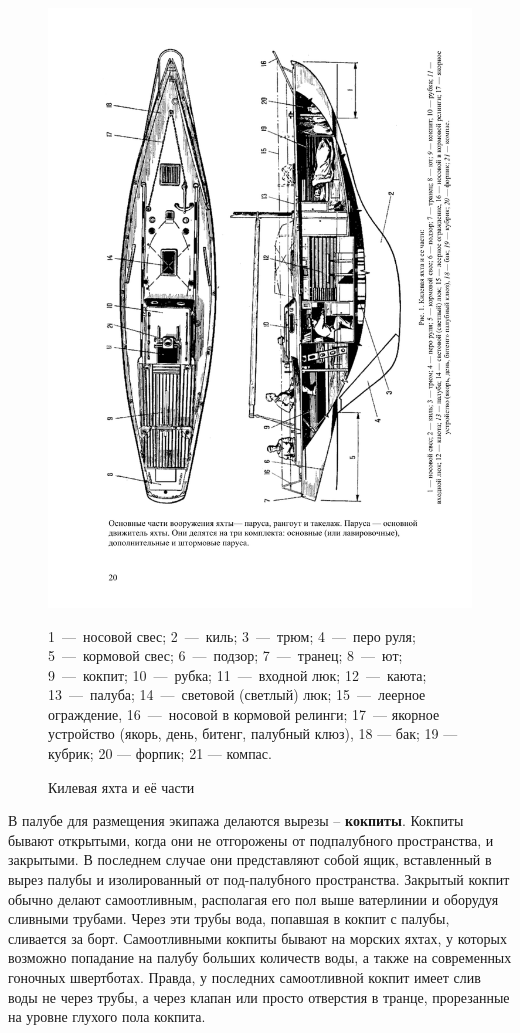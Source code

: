 \documentclass[a4paper, 12pt, twoside, final]{scrbook}
\begin{document}
\begin{figure}[htbp]
\centering
\includegraphics[scale=0.9]{Kilevaya_yachta_i_ee_chasti}
\par
\protect\caption{\label{fig:1}Килевая
яхта и её части}
\centering{}\small 1~---~носовой свес; 2~---~киль; 3~---~трюм; 4~---~перо
руля; 5~---~кормовой свес; 6~---~подзор; 7~---~транец; 8~---~ют; 9~---~кокпит;
10~---~рубка; 11~---~входной люк; 12~---~каюта; 13~---~палуба; 14~---~световой
(светлый) люк; 15~---~леерное ограждение, 16~---~носовой в кормовой
релинги; 17~--- якорное устройство (якорь, день, битенг, палубный клюз),
18 --- бак; 19 --- кубрик; 20 --- форпик; 21 --- компас.
\end{figure}

В палубе для размещения экипажа делаются вырезы \--- \textbf{кокпиты}.
Кокпиты бывают открытыми, когда они не отгорожены от подпалубного
пространства, и закрытыми. В последнем случае они представляют собой
ящик, вставленный в вырез палубы и изолированный от под-палубного
пространства. Закрытый кокпит обычно делают самоотливным, располагая
его пол выше ватерлинии и оборудуя сливными трубами. Через эти трубы
вода, попавшая в кокпит с палубы, сливается за борт. Самоотливными
кокпиты бывают на морских яхтах, у которых возможно попадание на палубу
больших количеств воды, а также на современных гоночных швертботах.
Правда, у последних самоотливной кокпит имеет слив воды не через трубы,
а через клапан или просто отверстия в транце, прорезанные на уровне
глухого пола кокпита.
\end{document}
